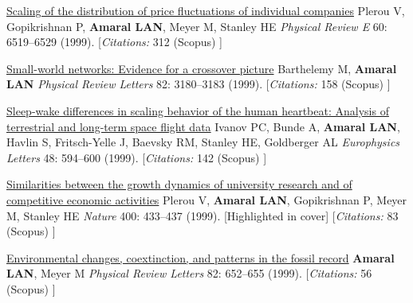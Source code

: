 \NumberedItem{\makebox[0.8cm][r]{[27]}}
\href{/people/amaral/scaling-of-the-distribution-of-price-fluctuations-of-individual-companies}
{Scaling of the distribution of price fluctuations of individual companies}
\newline
Plerou V, Gopikrishnan P, {\textbf{Amaral LAN}}, Meyer M, Stanley HE
\newline
\textit{Physical Review E}
    60:
6519--6529 (1999).
    [{\em{Citations:}}  312 (Scopus) ]
\newline
\Gap
~
\Gap

\NumberedItem{\makebox[0.8cm][r]{[26]}}
\href{/people/amaral/small-world-networks-evidence-for-a-crossover-picture}
{Small-world networks: Evidence for a crossover picture}
\newline
Barthelemy M, {\textbf{Amaral LAN}}
\newline
\textit{Physical Review Letters}
    82:
3180--3183 (1999).
    [{\em{Citations:}}  158 (Scopus) ]
\newline
\Gap
~
\Gap

\NumberedItem{\makebox[0.8cm][r]{[25]}}
\href{/people/amaral/sleep-wake-differences-in-scaling-behavior-of-the-human-heartbeat-analysis-of-terrestrial-and-long-term-space-flight-data}
{Sleep-wake differences in scaling behavior of the human heartbeat: Analysis of terrestrial and long-term space flight data}
\newline
Ivanov PC, Bunde A, {\textbf{Amaral LAN}}, Havlin S, Fritsch-Yelle J, Baevsky RM, Stanley HE, Goldberger AL
\newline
\textit{Europhysics Letters}
    48:
594--600 (1999).
    [{\em{Citations:}}  142 (Scopus) ]
\newline
\Gap
~
\Gap

\NumberedItem{\makebox[0.8cm][r]{[24]}}
\href{/people/amaral/similarities-between-the-growth-dynamics-of-university-research-and-of-competitive-economic-activities}
{Similarities between the growth dynamics of university research and of competitive economic activities}
\newline
Plerou V, {\textbf{Amaral LAN}}, Gopikrishnan P, Meyer M, Stanley HE
\newline
\textit{Nature}
    400:
433--437 (1999).
    [Highlighted in cover]
    [{\em{Citations:}}  83 (Scopus) ]
\newline
\Gap
~
\Gap

\NumberedItem{\makebox[0.8cm][r]{[23]}}
\href{/people/amaral/environmental-changes-coextinction-and-patterns-in-the-fossil-record}
{Environmental changes, coextinction, and patterns in the fossil record}
\newline
{\textbf{Amaral LAN}}, Meyer M
\newline
\textit{Physical Review Letters}
    82:
652--655 (1999).
    [{\em{Citations:}}  56 (Scopus) ]
\newline
\Gap
~
\Gap

